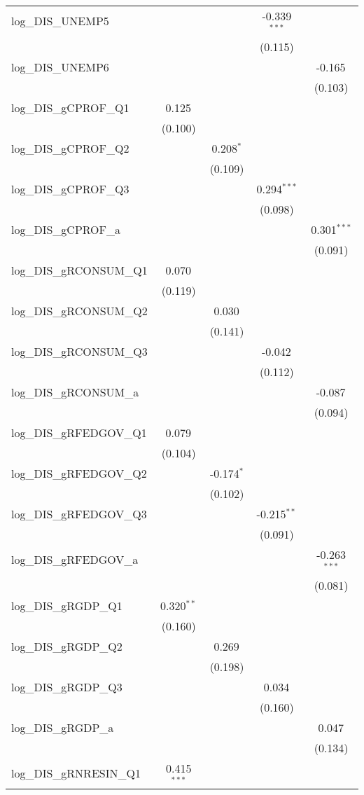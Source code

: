 \begin{table}[!htbp]
\begin{tabular}{@{\extracolsep{5pt}}lcccc}
 log_DIS_UNEMP5 & & & -0.339$^{***}$ & \\
& & & (0.115) & \\
 log_DIS_UNEMP6 & & & & -0.165$^{}$ \\
& & & & (0.103) \\
 log_DIS_gCPROF_Q1 & 0.125$^{}$ & & & \\
& (0.100) & & & \\
 log_DIS_gCPROF_Q2 & & 0.208$^{*}$ & & \\
& & (0.109) & & \\
 log_DIS_gCPROF_Q3 & & & 0.294$^{***}$ & \\
& & & (0.098) & \\
 log_DIS_gCPROF_a & & & & 0.301$^{***}$ \\
& & & & (0.091) \\
 log_DIS_gRCONSUM_Q1 & 0.070$^{}$ & & & \\
& (0.119) & & & \\
 log_DIS_gRCONSUM_Q2 & & 0.030$^{}$ & & \\
& & (0.141) & & \\
 log_DIS_gRCONSUM_Q3 & & & -0.042$^{}$ & \\
& & & (0.112) & \\
 log_DIS_gRCONSUM_a & & & & -0.087$^{}$ \\
& & & & (0.094) \\
 log_DIS_gRFEDGOV_Q1 & 0.079$^{}$ & & & \\
& (0.104) & & & \\
 log_DIS_gRFEDGOV_Q2 & & -0.174$^{*}$ & & \\
& & (0.102) & & \\
 log_DIS_gRFEDGOV_Q3 & & & -0.215$^{**}$ & \\
& & & (0.091) & \\
 log_DIS_gRFEDGOV_a & & & & -0.263$^{***}$ \\
& & & & (0.081) \\
 log_DIS_gRGDP_Q1 & 0.320$^{**}$ & & & \\
& (0.160) & & & \\
 log_DIS_gRGDP_Q2 & & 0.269$^{}$ & & \\
& & (0.198) & & \\
 log_DIS_gRGDP_Q3 & & & 0.034$^{}$ & \\
& & & (0.160) & \\
 log_DIS_gRGDP_a & & & & 0.047$^{}$ \\
& & & & (0.134) \\
 log_DIS_gRNRESIN_Q1 & 0.415$^{***}$ & & & \\

\end{tabular}
\end{table}
